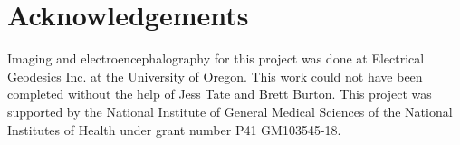 %   

\section{Acknowledgements}
\label{sec:acknowl}

Imaging and electroencephalography for this project was done at Electrical Geodesics Inc. at the University of Oregon. This work could not have been completed without the help of Jess Tate and Brett Burton. This project was supported by the National Institute of General Medical Sciences of the National Institutes of Health under grant number P41 GM103545-18. 